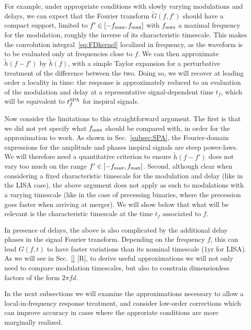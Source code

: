 \documentclass[aps,showpacs,twocolumn,
prd,superscriptaddress,nofootinbib]{revtex4-1}
\newcommand{\tf}{t_{f}}
\newcommand{\tfSPA}{t_{f}^{\rm SPA}}
\newcommand{\SM}[1]{{\color{Red} #1}}
\newcommand{\jgb}[1]{{\color{DarkGreen} #1}}
\begin{document}
\jgb{For example, under appropriate conditions with slowly varying modulations and delays, we can expect that} the Fourier transform $\tilde{G}(f,f')$ should have a compact support, limited to $f' \in [-f_{\rm max}, f_{\rm max}]$ with $f_{\rm max}$ a maximal frequency for the modulation, roughly the inverse of its characteristic timescale. This makes the convolution integral~\eqref{eq:FDkernel} localized in frequency, as the waveform is to be evaluated only at frequencies close to $f$. We can then approximate $\tilde{h}(f-f')$ by $\tilde{h}(f)$, with a simple Taylor expansion for a perturbative treatment of the difference between the two. Doing so, we will recover at leading order a locality in time: the response is approximately reduced to an evaluation of the modulation and delay at a representative signal-dependent time $\tf$, which will be equivalent to $\tfSPA$ for inspiral signals.

Now consider the limitations to this straightforward argument. The first is that we did not yet specify what $f_{\rm max}$ should be compared with, in order for the approximation to work. As shown in Sec.~\ref{subsec:SPA}, the Fourier-domain expressions for the amplitude and phases inspiral signals are steep power-laws. We will therefore need a quantitative criterion to ensure $\tilde{h}(f-f')$ does not vary too much on the range $f'\in [-f_{\rm max}, f_{\rm max}]$. Second, although clear when considering a fixed characteristic timescale for the modulation and delay (like in the LISA case), the above argument does not apply as such to modulations with a varying timescale (like in the case of precessing binaries, where the precession goes faster when arriving at merger). We will show below that what will be relevant is the characteristic timescale at the time $t_{f}$ associated to $f$. 

In presence of delays, the above is also complicated by the additional delay phases in the signal Fourier transform. Depending on the frequency $f$, this can lead $G(f,t)$ to have faster variations than its nominal timescale ($1\mathrm{yr}$ for LISA). As we will see in Sec.~\ref{} \SM{[R]}, \jgb{to derive useful approximations we will not only need to compare modulation timescales, but also to constrain dimensionless factors of the form $2\pi f d$.}

\jgb{In the next subsections we will examine the approximations necessary to allow a local-in-frequency response treatment, and consider low-order corrections which can improve accuracy in cases where the approriate conditions are more marginally realized.}
\end{document}
